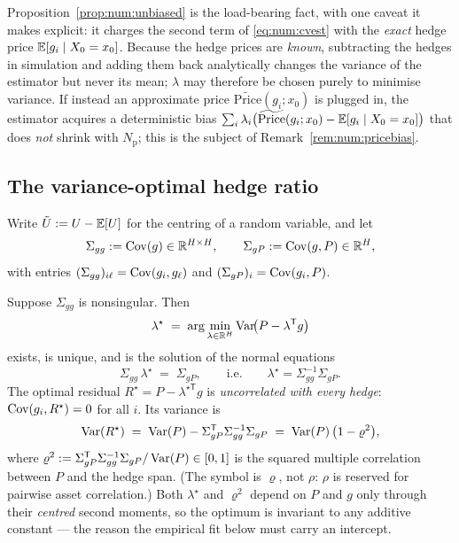 Proposition~\ref{prop:num:unbiased} is the load-bearing fact, with one caveat it
makes explicit: it charges the second term of \eqref{eq:num:cvest} with the
\emph{exact} hedge price $\mathbb{E}[g_i \mid X_0 = x_0]$. Because the hedge prices are
\emph{known}, subtracting the hedges in simulation and adding them back
analytically changes the variance of the estimator but never its mean;
$\lambda$ may therefore be chosen purely to minimise variance. If instead an
approximate price $\widetilde{\mathrm{Price}}(g_i;x_0)$ is plugged in, the estimator
acquires a deterministic bias
$\sum_i \lambda_i\bigl(\widetilde{\mathrm{Price}}(g_i;x_0) - \mathbb{E}[g_i\mid X_0=x_0]\bigr)$
that does \emph{not} shrink with $N_{\mathrm{p}}$; this is the subject of
Remark~\ref{rem:num:pricebias}.

\subsection{The variance-optimal hedge ratio}

Write $\tilde U := U - \mathbb{E}[U]$ for the centring of a random variable, and let
\[
   \Sigma_{gg} := \operatorname{Cov}(g) \in \mathbb{R}^{H\times H},
   \qquad
   \Sigma_{gP} := \operatorname{Cov}(g, P) \in \mathbb{R}^{H},
\]
with entries $(\Sigma_{gg})_{i\ell} = \operatorname{Cov}(g_i, g_\ell)$ and
$(\Sigma_{gP})_i = \operatorname{Cov}(g_i, P)$.

\begin{theorem}\label{thm:num:proj}
Suppose $\Sigma_{gg}$ is nonsingular. Then
\[
   \lambda^\star \;=\; \arg\min_{\lambda \in \mathbb{R}^H}
     \operatorname{Var}\!\bigl(P - \lambda^{\mathsf T} g\bigr)
\]
exists, is unique, and is the solution of the normal equations
\begin{equation}\label{eq:num:normal}
   \Sigma_{gg}\, \lambda^\star \;=\; \Sigma_{gP},
   \qquad\text{i.e.}\qquad
   \lambda^\star = \Sigma_{gg}^{-1}\Sigma_{gP}.
\end{equation}
The optimal residual $R^\star = P - \lambda^{\star\mathsf T} g$ is
\emph{uncorrelated with every hedge}: $\operatorname{Cov}(g_i, R^\star) = 0$ for all $i$.
Its variance is
\begin{equation}\label{eq:num:varred}
   \operatorname{Var}(R^\star) \;=\; \operatorname{Var}(P) - \Sigma_{gP}^{\mathsf T}\Sigma_{gg}^{-1}\Sigma_{gP}
   \;=\; \operatorname{Var}(P)\,\bigl(1 - \varrho^2\bigr),
\end{equation}
where
$\varrho^2 := \Sigma_{gP}^{\mathsf T}\Sigma_{gg}^{-1}\Sigma_{gP}/\operatorname{Var}(P) \in [0,1]$
is the squared multiple correlation between $P$ and the hedge span. (The
symbol is $\varrho$, not $\rho$: $\rho$ is reserved for pairwise asset
correlation.) Both $\lambda^\star$ and $\varrho^2$ depend on
$P$ and $g$ only through their \emph{centred} second moments, so the optimum is
invariant to any additive constant --- the reason the empirical fit below must
carry an intercept.
\end{theorem}

